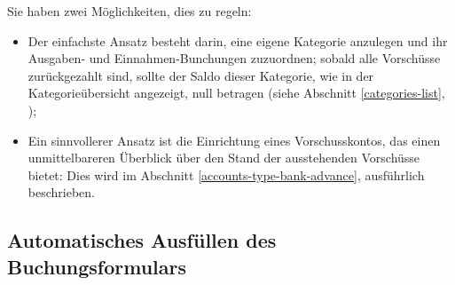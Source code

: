 Sie haben zwei Möglichkeiten, dies zu regeln:
\begin{itemize}
	\item Der einfachste Ansatz besteht darin, eine eigene Kategorie anzulegen und ihr Ausgaben- und Einnahmen-Bunchungen zuzuordnen; sobald alle Vorschüsse zurückgezahlt sind, sollte der Saldo dieser Kategorie, wie in der Kategorieübersicht angezeigt, null betragen (siehe Abschnitt \vref{categories-list}, );
	\item Ein sinnvollerer Ansatz ist die Einrichtung eines Vorschusskontos, das einen unmittelbareren Überblick über den Stand der ausstehenden Vorschüsse bietet: Dies wird im Abschnitt \vref{accounts-type-bank-advance},  ausführlich beschrieben.
\end{itemize}


\subsection{Automatisches Ausfüllen des Buchungsformulars\label{transactions-new-autofill}}%

